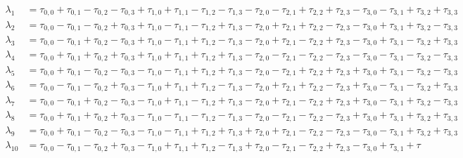 \begin{align}
\lambda_{1}&=
 \tau _{0,0}+\tau _{0,1}-\tau _{0,2}-\tau _{0,3}+\tau _{1,0}+\tau _{1,1}-\tau _{1,2}-\tau
   _{1,3}-\tau _{2,0}-\tau _{2,1}+\tau _{2,2}+\tau _{2,3}-\tau _{3,0}-\tau _{3,1}+\tau
   _{3,2}+\tau _{3,3} \nonumber \\
\lambda_{2}&=   
 \tau _{0,0}-\tau _{0,1}-\tau _{0,2}+\tau _{0,3}+\tau _{1,0}-\tau _{1,1}-\tau _{1,2}+\tau
   _{1,3}-\tau _{2,0}+\tau _{2,1}+\tau _{2,2}-\tau _{2,3}-\tau _{3,0}+\tau _{3,1}+\tau
   _{3,2}-\tau _{3,3} \nonumber \\
\lambda_{3}&=
 \tau _{0,0}-\tau _{0,1}+\tau _{0,2}-\tau _{0,3}+\tau _{1,0}-\tau _{1,1}+\tau _{1,2}-\tau
   _{1,3}-\tau _{2,0}+\tau _{2,1}-\tau _{2,2}+\tau _{2,3}-\tau _{3,0}+\tau _{3,1}-\tau
   _{3,2}+\tau _{3,3} \nonumber \\
\lambda_{4}&=
 \tau _{0,0}+\tau _{0,1}+\tau _{0,2}+\tau _{0,3}+\tau _{1,0}+\tau _{1,1}+\tau _{1,2}+\tau
   _{1,3}-\tau _{2,0}-\tau _{2,1}-\tau _{2,2}-\tau _{2,3}-\tau _{3,0}-\tau _{3,1}-\tau
   _{3,2}-\tau _{3,3}\nonumber \\
\lambda_{5}&=
 \tau _{0,0}+\tau _{0,1}-\tau _{0,2}-\tau _{0,3}-\tau _{1,0}-\tau _{1,1}+\tau _{1,2}+\tau
   _{1,3}-\tau _{2,0}-\tau _{2,1}+\tau _{2,2}+\tau _{2,3}+\tau _{3,0}+\tau _{3,1}-\tau
   _{3,2}-\tau _{3,3}\nonumber \\
\lambda_{6}&=
 \tau _{0,0}-\tau _{0,1}-\tau _{0,2}+\tau _{0,3}-\tau _{1,0}+\tau _{1,1}+\tau _{1,2}-\tau
   _{1,3}-\tau _{2,0}+\tau _{2,1}+\tau _{2,2}-\tau _{2,3}+\tau _{3,0}-\tau _{3,1}-\tau
   _{3,2}+\tau _{3,3}\nonumber \\
\lambda_{7}&=
 \tau _{0,0}-\tau _{0,1}+\tau _{0,2}-\tau _{0,3}-\tau _{1,0}+\tau _{1,1}-\tau _{1,2}+\tau
   _{1,3}-\tau _{2,0}+\tau _{2,1}-\tau _{2,2}+\tau _{2,3}+\tau _{3,0}-\tau _{3,1}+\tau
   _{3,2}-\tau _{3,3}\nonumber \\
\lambda_{8}&=   
 \tau _{0,0}+\tau _{0,1}+\tau _{0,2}+\tau _{0,3}-\tau _{1,0}-\tau _{1,1}-\tau _{1,2}-\tau
   _{1,3}-\tau _{2,0}-\tau _{2,1}-\tau _{2,2}-\tau _{2,3}+\tau _{3,0}+\tau _{3,1}+\tau
   _{3,2}+\tau _{3,3}\nonumber \\
\lambda_{9}&=   
 \tau _{0,0}+\tau _{0,1}-\tau _{0,2}-\tau _{0,3}-\tau _{1,0}-\tau _{1,1}+\tau _{1,2}+\tau
   _{1,3}+\tau _{2,0}+\tau _{2,1}-\tau _{2,2}-\tau _{2,3}-\tau _{3,0}-\tau _{3,1}+\tau
   _{3,2}+\tau _{3,3}\nonumber \\
\lambda_{10}&=   
 \tau _{0,0}-\tau _{0,1}-\tau _{0,2}+\tau _{0,3}-\tau _{1,0}+\tau _{1,1}+\tau _{1,2}-\tau
   _{1,3}+\tau _{2,0}-\tau _{2,1}-\tau _{2,2}+\tau _{2,3}-\tau _{3,0}+\tau _{3,1}+\tau

\end{align}
